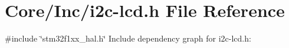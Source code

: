 \hypertarget{i2c-lcd_8h}{}\section{Core/\+Inc/i2c-\/lcd.h File Reference}
\label{i2c-lcd_8h}
{\ttfamily \#include \char`\"{}stm32f1xx\+\_\+hal.\+h\char`\"{}}\newline
Include dependency graph for i2c-\/lcd.h\+:
